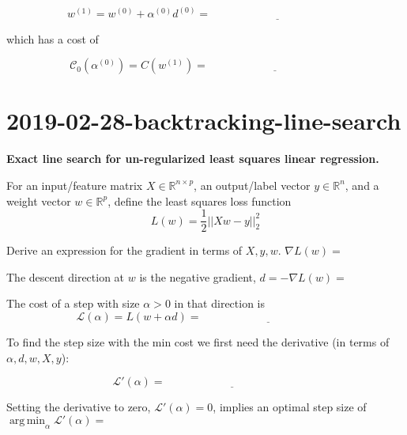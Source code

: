 \documentclass{article}
\DeclareMathOperator*{\argmin}{arg\,min}
\begin{document}
\begin{equation*}
  w^{(1)} = w^{(0)} + \alpha^{(0)} d^{(0)} = \underline{\hspace{2in}}
\end{equation*}

\vskip 1cm
which has a cost of

\begin{equation*}
  \mathcal C_0(\alpha^{(0)}) = C(w^{(1)}) = \underline{\hspace{2in}}
\end{equation*}


\newpage
\section{2019-02-28-backtracking-line-search}
\textbf{Exact line search for un-regularized least squares linear regression. }

For an input/feature matrix $X\in \mathbb R^{n\times p}$, an
output/label vector $y\in\mathbb R^n$, and a weight vector
$w\in\mathbb R^p$, define the least squares loss function
$$ L(w) = \frac 1 2|| Xw - y||^2_2$$

\vskip 1in Derive an expression for the gradient in terms of $X,y,w$.
$\nabla L(w)=$\underline{\hspace{2in}}

\vskip 1in
The descent direction at $w$ is the negative gradient,
$ d = -\nabla L(w)=$\underline{\hspace{2in}}

The cost of a step with size $\alpha>0$ in that direction is
\vskip 1in
\begin{equation*}
  \mathcal L(\alpha) = L(w + \alpha d) = \underline{\hspace{2in}}
\end{equation*}

To find the step size with the min cost we first need the derivative
(in terms of $\alpha,d,w,X,y$):

\vskip 1in
\begin{equation*}
  \mathcal L'(\alpha) = \underline{\hspace{2in}}
\end{equation*}

Setting the derivative to zero, $\mathcal L'(\alpha)=0$,  implies an optimal step size of
\vskip 1in
$\argmin_\alpha \mathcal
L'(\alpha)=$\underline{\hspace{2in}}
\end{document}
